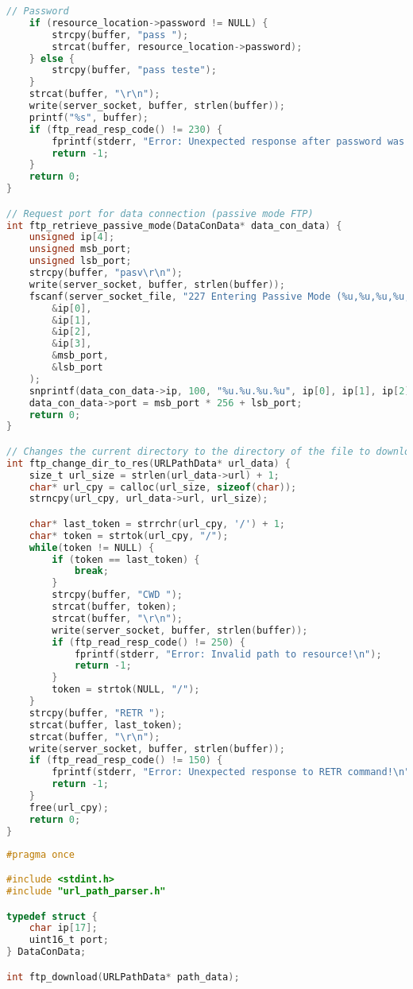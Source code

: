 \begin{lstlisting}[language=C, caption=ftp.c]
    // Password
    if (resource_location->password != NULL) {
        strcpy(buffer, "pass ");
        strcat(buffer, resource_location->password);
    } else {
        strcpy(buffer, "pass teste");
    }
    strcat(buffer, "\r\n");
    write(server_socket, buffer, strlen(buffer));
    printf("%s", buffer);
    if (ftp_read_resp_code() != 230) {
        fprintf(stderr, "Error: Unexpected response after password was sent!\n");
        return -1;
    }
    return 0;
}

// Request port for data connection (passive mode FTP)
int ftp_retrieve_passive_mode(DataConData* data_con_data) {
    unsigned ip[4];
    unsigned msb_port;
    unsigned lsb_port;
    strcpy(buffer, "pasv\r\n");
    write(server_socket, buffer, strlen(buffer));
    fscanf(server_socket_file, "227 Entering Passive Mode (%u,%u,%u,%u,%u,%u).", 
        &ip[0],
        &ip[1],
        &ip[2],
        &ip[3],
        &msb_port,
        &lsb_port
    );
    snprintf(data_con_data->ip, 100, "%u.%u.%u.%u", ip[0], ip[1], ip[2], ip[3]);
    data_con_data->port = msb_port * 256 + lsb_port;
    return 0;
}

// Changes the current directory to the directory of the file to download
int ftp_change_dir_to_res(URLPathData* url_data) {
    size_t url_size = strlen(url_data->url) + 1;
    char* url_cpy = calloc(url_size, sizeof(char));
    strncpy(url_cpy, url_data->url, url_size);

    char* last_token = strrchr(url_cpy, '/') + 1;
    char* token = strtok(url_cpy, "/");
    while(token != NULL) {
        if (token == last_token) {
            break;
        }
        strcpy(buffer, "CWD ");
        strcat(buffer, token);
        strcat(buffer, "\r\n");
        write(server_socket, buffer, strlen(buffer));
        if (ftp_read_resp_code() != 250) {
            fprintf(stderr, "Error: Invalid path to resource!\n");
            return -1;
        }
        token = strtok(NULL, "/");
    }
    strcpy(buffer, "RETR ");
    strcat(buffer, last_token);
    strcat(buffer, "\r\n");
    write(server_socket, buffer, strlen(buffer));
    if (ftp_read_resp_code() != 150) {
        fprintf(stderr, "Error: Unexpected response to RETR command!\n");
        return -1;
    }
    free(url_cpy);
    return 0;
}
\end{lstlisting}


\begin{lstlisting}[language=C, caption=ftp.h]
#pragma once

#include <stdint.h>
#include "url_path_parser.h"

typedef struct {
    char ip[17];
    uint16_t port;
} DataConData;

int ftp_download(URLPathData* path_data);
\end{lstlisting}

